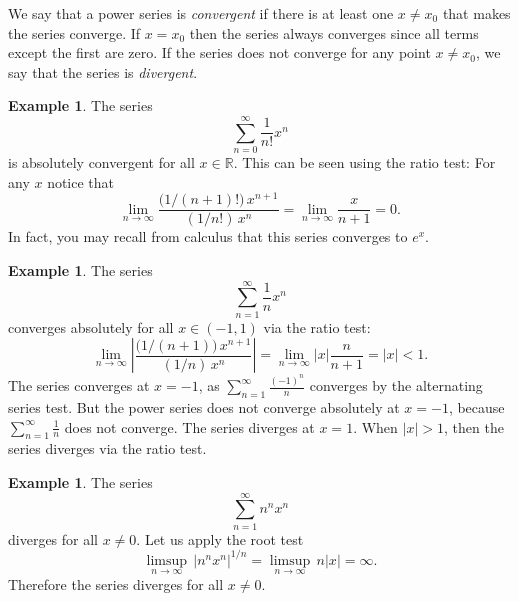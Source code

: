 \documentclass[12pt]{book}
\newcommand{\abs}[1]{\left\lvert {#1} \right\rvert}
\newcommand{\R}{{\mathbb{R}}}
\theoremstyle{plain}
\theoremstyle{remark}
\theoremstyle{definition}
\theoremstyle{exercise}
\theoremstyle{example}
\newtheorem{example}[thm]{Example}
\begin{document}
We say that a power series is
\emph{convergent} if
there is at least one $x \not= x_0$ that makes the series converge.
If $x=x_0$ then the series always
converges since all terms except the first are zero.
If the series does not converge for any point $x \not= x_0$, we say that
the series is \emph{divergent}.

\begin{example} \label{ps:expex}
The series
\begin{equation*}
\sum_{n=0}^\infty \frac{1}{n!} x^n
\end{equation*}
is absolutely convergent for all $x \in \R$.  This can be seen using the ratio test:
For any $x$ notice that
\begin{equation*}
\lim_{n \to \infty}
\frac{\bigl(1/(n+1)!\bigr) \, x^{n+1}}{(1/n!) \, x^{n}}
=
\lim_{n \to \infty}
\frac{x}{n+1}
=
0.
\end{equation*}
In fact, you may recall from calculus that this series converges to $e^x$.
\end{example}

\begin{example} \label{ps:1kex}
The series
\begin{equation*}
\sum_{n=1}^\infty \frac{1}{n} x^n
\end{equation*}
converges absolutely for all $x \in (-1,1)$ via the ratio test:
\begin{equation*}
\lim_{n \to \infty}
\abs{
\frac{\bigl(1/(n+1) \bigr) \, x^{n+1}}{(1/n) \, x^{n}}
}
=
\lim_{n \to \infty}
\abs{x} \frac{n}{n+1}
=
\abs{x} < 1 .
\end{equation*}
The series converges at $x=-1$,
as
$\sum_{n=1}^\infty \frac{{(-1)}^n}{n}$ converges
by the alternating series
test.
But the power series does not converge absolutely at $x=-1$, because
$\sum_{n=1}^\infty \frac{1}{n}$ does not converge.
The series
diverges at $x=1$.
When $\abs{x} > 1$, then the series diverges via the ratio test.
\end{example}

\begin{example} \label{ps:divergeex}
The series
\begin{equation*}
\sum_{n=1}^\infty n^n x^n
\end{equation*}
diverges for all $x \not= 0$.  Let us apply the root test
\begin{equation*}
\limsup_{n\to\infty}
\,
\abs{n^n x^n}^{1/n}
=
\limsup_{n\to\infty}
\,
n \abs{x}
= \infty .
\end{equation*}
Therefore the series diverges for all $x \not= 0$.
\end{example}
\end{document}
